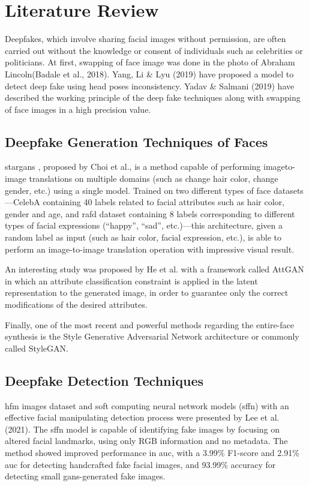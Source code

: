\chapter{Literature Review}
Deepfakes, which involve sharing facial images without permission, are often carried out without the knowledge or consent of individuals such as celebrities or politicians. At first, swapping of face image was done in the photo of Abraham Lincoln(Badale et al., 2018)\cite{badale2018deep}. Yang, Li \& Lyu (2019)\cite{yang2019exposing} have proposed a model to detect deep fake using head poses inconsistency. Yadav \& Salmani (2019)\cite{yadav2019deepfake} have described the working principle of the deep fake techniques along with swapping of face images in a high precision value.

\section{Deepfake Generation Techniques of Faces}
\acrshort{stargans} \cite{choi2018stargan}, proposed by Choi et al., is a method capable of performing imageto-image translations on multiple domains (such as change hair color, change gender,
etc.) using a single model. Trained on two different types of face datasets—CelebA \cite{7410782}
containing 40 labels related to facial attributes such as hair color, gender and age, and
\acrshort*{rafd} dataset \cite{cho2019imagetoimage} containing 8 labels corresponding to different types of facial expressions
(“happy”, “sad”, etc.)—this architecture, given a random label as input (such as hair color, facial expression, etc.), is able to perform an image-to-image translation operation with impressive visual result. 

An interesting study was proposed by He et al. \cite{7410782} with a framework called
AttGAN in which an attribute classification constraint is applied in the latent representation to the generated image, in order to guarantee only the correct modifications of the
desired attributes. 

Finally, one of the most recent and powerful methods regarding the entire-face synthesis is the Style Generative Adversarial Network architecture or commonly called
StyleGAN. \cite{Giudice_2021}

\section{Deepfake Detection Techniques}
\acrshort*{hfm} images dataset and soft computing neural network models (\acrshort*{sffn}) with an effective facial manipulating detection process were presented by Lee et al. (2021)\cite{lee2021detecting}. The \acrshort*{sffn} model is capable of identifying fake images by focusing on altered facial landmarks, using only RGB information and no metadata. The method showed improved performance in \acrfull{auc}, with a 3.99\% F1-score and 2.91\% \acrshort{auc} for detecting handcrafted fake facial images, and 93.99\% accuracy for detecting small \acrshort*{gans}-generated fake images.

